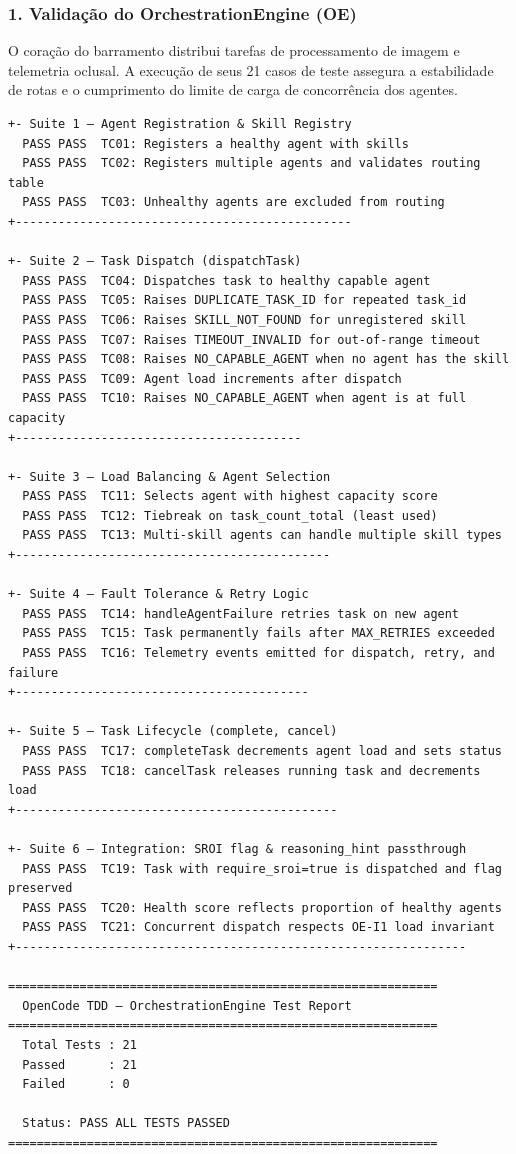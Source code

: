 \subsubsection*{1. Validação do OrchestrationEngine (OE)}

O coração do barramento distribui tarefas de processamento de imagem e telemetria oclusal. A execução de seus 21 casos de teste assegura a estabilidade de rotas e o cumprimento do limite de carga de concorrência dos agentes.

\begin{lstlisting}[style=bashstyle, caption={Saída do Executor de Testes do OpenCode OrchestrationEngine}, label={lst:tdd_output}]
+- Suite 1 — Agent Registration & Skill Registry
  PASS PASS  TC01: Registers a healthy agent with skills
  PASS PASS  TC02: Registers multiple agents and validates routing table
  PASS PASS  TC03: Unhealthy agents are excluded from routing
+-----------------------------------------------

+- Suite 2 — Task Dispatch (dispatchTask)
  PASS PASS  TC04: Dispatches task to healthy capable agent
  PASS PASS  TC05: Raises DUPLICATE_TASK_ID for repeated task_id
  PASS PASS  TC06: Raises SKILL_NOT_FOUND for unregistered skill
  PASS PASS  TC07: Raises TIMEOUT_INVALID for out-of-range timeout
  PASS PASS  TC08: Raises NO_CAPABLE_AGENT when no agent has the skill
  PASS PASS  TC09: Agent load increments after dispatch
  PASS PASS  TC10: Raises NO_CAPABLE_AGENT when agent is at full capacity
+----------------------------------------

+- Suite 3 — Load Balancing & Agent Selection
  PASS PASS  TC11: Selects agent with highest capacity score
  PASS PASS  TC12: Tiebreak on task_count_total (least used)
  PASS PASS  TC13: Multi-skill agents can handle multiple skill types
+--------------------------------------------

+- Suite 4 — Fault Tolerance & Retry Logic
  PASS PASS  TC14: handleAgentFailure retries task on new agent
  PASS PASS  TC15: Task permanently fails after MAX_RETRIES exceeded
  PASS PASS  TC16: Telemetry events emitted for dispatch, retry, and failure
+-----------------------------------------

+- Suite 5 — Task Lifecycle (complete, cancel)
  PASS PASS  TC17: completeTask decrements agent load and sets status
  PASS PASS  TC18: cancelTask releases running task and decrements load
+---------------------------------------------

+- Suite 6 — Integration: SROI flag & reasoning_hint passthrough
  PASS PASS  TC19: Task with require_sroi=true is dispatched and flag preserved
  PASS PASS  TC20: Health score reflects proportion of healthy agents
  PASS PASS  TC21: Concurrent dispatch respects OE-I1 load invariant
+---------------------------------------------------------------

============================================================
  OpenCode TDD — OrchestrationEngine Test Report
============================================================
  Total Tests : 21
  Passed      : 21
  Failed      : 0

  Status: PASS ALL TESTS PASSED
============================================================
\end{lstlisting}

